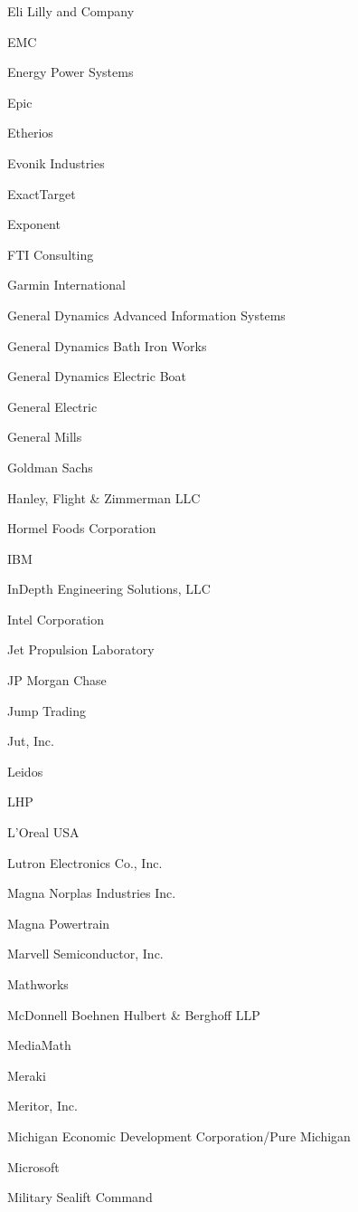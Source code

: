 \documentclass[twoside]{article}
\begin{document}
\begin{center}
\begin{multicols}{5}
\begin{FlushLeft}
\begin{compactitem}
\item Eli Lilly and Company
\item EMC
\item Energy Power Systems
\item Epic
\item Etherios
\item Evonik Industries
\item ExactTarget
\item Exponent
\item FTI Consulting
\item Garmin International
\item General Dynamics Advanced Information Systems
\item General Dynamics Bath Iron Works
\item General Dynamics Electric Boat
\item General Electric
\item General Mills
\item Goldman Sachs
\item Hanley, Flight \& Zimmerman LLC
\item Hormel Foods Corporation
\item IBM
\item InDepth Engineering Solutions, LLC
\item Intel Corporation
\item Jet Propulsion Laboratory
\item JP Morgan Chase
\item Jump Trading
\item Jut, Inc.
\item Leidos
\item LHP
\item L'Oreal USA
\item Lutron Electronics Co., Inc.
\item Magna Norplas Industries Inc.
\item Magna Powertrain
\item Marvell Semiconductor, Inc.
\item Mathworks
\item McDonnell Boehnen Hulbert \& Berghoff LLP
\item MediaMath
\item Meraki
\item Meritor, Inc.
\item Michigan Economic Development Corporation/Pure Michigan
\item Microsoft
\item Military Sealift Command

\end{compactitem}
\end{FlushLeft}
\end{multicols}
\end{center}
\end{document}
